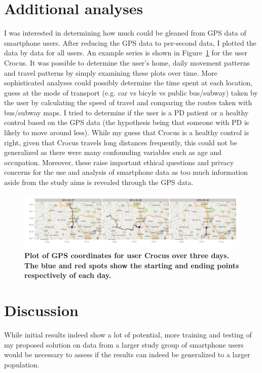 \documentclass[8pt]{article}
\begin{document}
\section{Additional analyses}
\label{sec:addition}
I was interested in determining how much could be gleaned from GPS data of smartphone users. After reducing the GPS data to per-second data, I plotted the data by data for all users. An example series is shown in Figure~\ref{fig:gps} for the user Crocus. It was possible to determine the user's home, daily movement patterns and travel patterns by simply examining these plots over time. More sophisticated analyses could possibly determine the time spent at each location, guess at the mode of transport (e.g. car vs bicyle vs public bus/subway) taken by the user by calculating the speed of travel and comparing the routes taken with bus/subway maps. I tried to determine if the user is a PD patient or a healthy control based on the GPS data (the hypothesis being that someone with PD is likely to move around less). While my guess that Crocus is a healthy control is right, given that Crocus travels long distances frequently, this could not be generalized as there were many confounding variables such as age and occupation. Moreover, these raise important ethical questions and privacy concerns for the use and analysis of smartphone data as too much information aside from the study aims is revealed through the GPS data.

\begin{figure}[htbp]
	\begin{center}
		\includegraphics[width = 1\textwidth]{fig/gps_CROCUS1.pdf}
		\caption{{\bf Plot of GPS coordinates for user Crocus over three days. The blue and red spots show the starting and ending points respectively of each day.}}
		\label{fig:gps}
	\end{center}
\end{figure}
\section{Discussion} 
\label{sec:discussion}
While initial results indeed show a lot of potential, more training and testing of my proposed solution on data from a larger study group of smartphone users would be necessary to assess if the results can indeed be generalized to a larger population.
\end{document}
